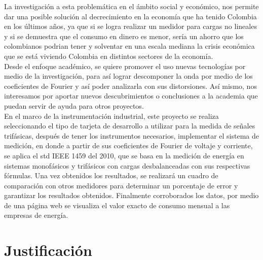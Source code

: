 La investigación a esta problemática en el ámbito social y económico, nos permite dar una posible solución al decrecimiento en la economía que ha tenido Colombia en los últimos años, ya que si se logra realizar un medidor para cargas no lineales y si se demuestra que el consumo en dinero es menor, sería un ahorro que los colombianos podrian tener y solventar en una escala mediana la crisis económica que se está viviendo Colombia en distintos sectores de la economía.\\

Desde el enfoque académico, se quiere promover el uso nuevas tecnologías por medio de la investigación, para así lograr descomponer la onda por medio de los coeficientes de Fourier y así poder analizarla con sus distorsiones. Así mismo, nos interesamos por aportar nuevos descubrimientos o conclusiones a la academia que puedan servir de ayuda para otros proyectos.\\

En el marco de la instrumentación industrial, este proyecto se realiza seleccionando el tipo de tarjeta de desarrollo a utilizar para la medida de señales trifásicas, después de tener los instrumentos necesarios, implementar el sistema de medición, en donde a partir de sus coeficientes de Fourier de voltaje y corriente, se aplica el std IEEE 1459 del 2010, que se basa en la medición de energía en sistemas monofásicos y trifásicos con cargas desbalanceadas con sus respectivas fórmulas. Una vez obtenidos los resultados, se realizará un cuadro de comparación con otros medidores para determinar un porcentaje de error y garantizar los resultados obtenidos. Finalmente corroborados los datos, por medio de una página web se visualiza el valor exacto de consumo mensual a las empresas de energía. \\



\newpage{\clearpage}
\chapter{ Justificación}

